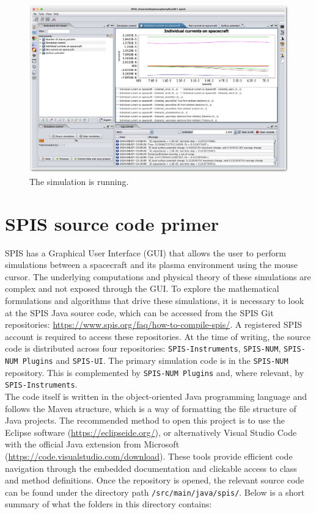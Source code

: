 \documentclass[a4paper, 12pt]{article}
\begin{document}
\begin{figure}[!ht]
    \centering
    \includegraphics[width=1\textwidth]{fig22.jpg}
    \caption{The simulation is running.}
    \label{22}
\end{figure}

\clearpage
\section{SPIS source code primer}

SPIS has a Graphical User Interface (GUI) that allows the user to perform simulations between a spacecraft and its plasma environment using the mouse cursor. The underlying computations and physical theory of these simulations are complex and not exposed through the GUI. To explore the mathematical formulations and algorithms that drive these simulations, it is necessary to look at the SPIS Java source code, which can be accessed from the SPIS Git repositories: \url{https://www.spis.org/faq/how-to-compile-spis/}. A registered SPIS account is required to access these repositories. At the time of writing, the source code is distributed across four repositories: \verb|SPIS-Instruments|, \verb|SPIS-NUM|, \verb|SPIS-NUM Plugins| and \verb|SPIS-UI|. The primary simulation code is in the \verb|SPIS-NUM| repository. This is complemented by \verb|SPIS-NUM Plugins| and, where relevant, by \verb|SPIS-Instruments|.\\

The code itself is written in the object-oriented Java programming language and follows the Maven structure, which is a way of formatting the file structure of Java projects. The recommended method to open this project is to use the Eclipse software (\url{https://eclipseide.org/}), or alternatively Visual Studio Code with the official Java extension from Microsoft (\url{https://code.visualstudio.com/download}). These tools provide efficient code navigation through the embedded documentation and clickable access to class and method definitions. Once the repository is opened, the relevant source code can be found under the directory path \verb|/src/main/java/spis/|. Below is a short summary of what the folders in this directory contains:
\end{document}
